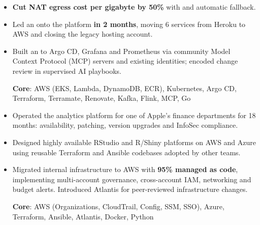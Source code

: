 \begin{itemize}
\item \textbf{Cut NAT egress cost per gigabyte by 50\%} with
and automatic fallback.
\item Led an  onto
the platform \textbf{in 2 months}, moving 6 services from Heroku to AWS and
closing the legacy hosting account.
\item Built an  to
Argo CD, Grafana and Prometheus via community Model Context Protocol (MCP)
servers and existing identities; encoded change review in supervised AI
playbooks.
\par\smallskip
\textbf{Core}: AWS (EKS, Lambda, DynamoDB, ECR), Kubernetes, Argo CD,
Terraform, Terramate, Renovate, Kafka, Flink, MCP, Go
\end{itemize}

\newpage

\divider

\begin{itemize}
\item Operated the analytics platform for one of Apple's finance departments for
18 months: availability, patching, version upgrades and InfoSec
compliance.
\item Designed highly available RStudio and R/Shiny platforms on AWS and
Azure using reusable Terraform and Ansible codebases adopted by other teams.
\item Migrated internal infrastructure to AWS with \textbf{95\% managed as
code}, implementing multi-account governance, cross-account IAM, networking and
budget alerts. Introduced Atlantis for peer-reviewed infrastructure changes.
\par\smallskip
\textbf{Core}: AWS (Organizations, CloudTrail, Config, SSM, SSO), Azure,
Terraform, Ansible, Atlantis, Docker, Python
\end{itemize}

